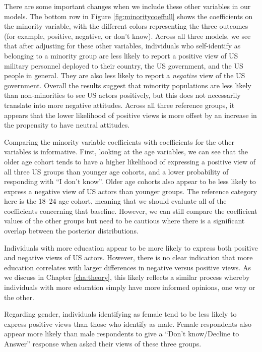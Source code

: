 There are some important changes when we include these other variables in our models. The bottom row in Figure \ref{fig:minoritycoeffull} shows the coefficients on the minority variable, with the different colors representing the three outcomes (for example, positive, negative, or don't know). Across all three models, we see that after adjusting for these other variables, individuals who self-identify as belonging to a minority group are less likely to report a positive view of US military personnel deployed to their country, the US government, and the US people in general. They are also less likely to report a \textit{negative} view of the US government. Overall the results suggest that minority populations are less likely than non-minorities to see US actors positively, but this does not necessarily translate into more negative attitudes. Across all three reference groups, it appears that the lower likelihood of positive views is more offset by an increase in the propensity to have neutral attitudes. 


Comparing the minority variable coefficients with coefficients for the other variables is informative. First, looking at the age variables, we can see that the older age cohort tends to have a higher likelihood of expressing a positive view of all three US groups than younger age cohorts, and a lower probability of responding with ``I don't know''. Older age cohorts also appear to be less likely to express a negative view of US actors than younger groups.  The reference category here is the 18--24 age cohort, meaning that we should evaluate all of the coefficients concerning that baseline. However, we can still compare the coefficient values of the other groups but need to be cautious where there is a significant overlap between the posterior distributions. 

Individuals with more education appear to be more likely to express both positive and negative views of US actors. However, there is no clear indication that more education correlates with larger differences in negative versus positive views. As we discuss in Chapter \ref{cha:theory}, this likely reflects a similar process whereby individuals with more education simply have more informed opinions, one way or the other. 


Regarding gender, individuals identifying as female tend to be less likely to express positive views than those who identify as male. Female respondents also appear more likely than male respondents to give a ``Don't know/Decline to Answer'' response when asked their views of these three groups.

